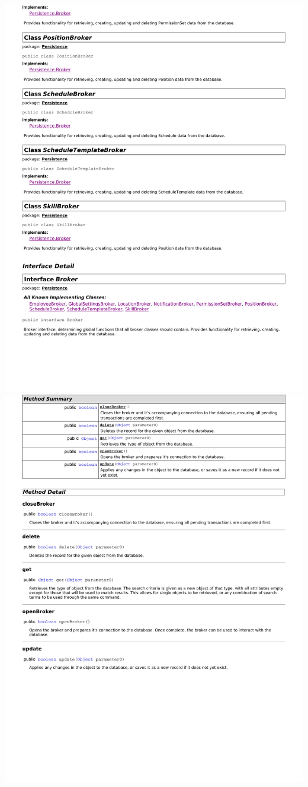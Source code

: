 \documentclass[letterpaper,12pt]{report}
\begin{document}
\includegraphics[scale=0.9,trim=20mm 30mm 25mm 25mm]{externals/dp2.pdf}
\newpage
\includegraphics[scale=0.9,trim=20mm 30mm 25mm 25mm]{externals/dp3.pdf}
\newpage
\end{document}
